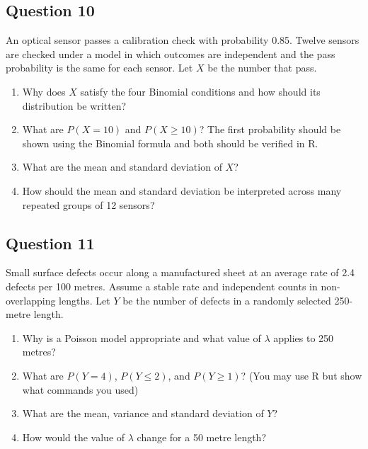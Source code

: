 \documentclass[10pt,letterpaper]{article}
\providecommand{\tightlist}{%
  \setlength{\itemsep}{0pt}\setlength{\parskip}{0pt}}
\begin{document}
\subsection*{Question 10}
An optical sensor passes a calibration check with probability 0.85. Twelve sensors are checked under a model in which outcomes are independent and the pass probability is the same for each sensor. Let \(X\) be the number that pass.

\begin{enumerate}
\def\labelenumi{\arabic{enumi}.}
\tightlist
	\item Why does \(X\) satisfy the four Binomial conditions and how should its distribution be written?
	\item What are \(P(X=10)\) and \(P(X\ge10)\)? The first probability should be shown using the Binomial formula and both should be verified in R.
	\item What are the mean and standard deviation of \(X\)?
	\item How should the mean and standard deviation be interpreted across many repeated groups of 12 sensors?
\end{enumerate}

\subsection*{Question 11}
Small surface defects occur along a manufactured sheet at an average rate of 2.4 defects per 100 metres. Assume a stable rate and independent counts in non-overlapping lengths. Let \(Y\) be the number of defects in a randomly selected 250-metre length.

\begin{enumerate}
\def\labelenumi{\arabic{enumi}.}
\tightlist
	\item Why is a Poisson model appropriate and what value of \(\lambda\) applies to 250 metres?
	\item What are \(P(Y=4)\), \(P(Y\le2)\), and \(P(Y\ge1)\)? (You may use R but show what commands you used)
	\item What are the mean, variance and standard deviation of \(Y\)?
	\item How would the value of \(\lambda\) change for a 50 metre length?
\end{enumerate}
\end{document}
